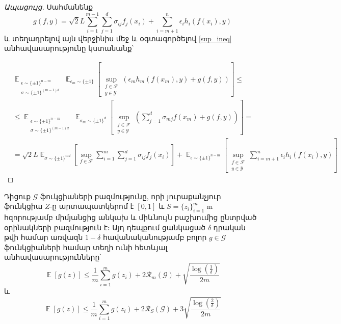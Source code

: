 \documentclass[11pt]{article}
\DeclareMathOperator*{\E}{\mathbb{E}}
\begin{document}
\begin{proof}[Ապացույց]
Սահմանենք $$g(f, y) = \sqrt{2}L\sum_{i=1}^{m-1}\sum_{j=1}^d{\sigma_{ij}f_j(x_i)}  + \sum_{i = m+1}^n\epsilon_ih_i(f(x_i), y)$$
և տեղադրելով այն վերջինիս մեջ և օգտագործելով \ref{sup_ineq} անհավասարությունը կստանանք՝


\begin{align*}
 &\E_{\substack{\epsilon \sim \{ \pm 1\}^{n-m}   \\ \sigma \sim \{ \pm 1\}^{(m-1)d} }}     \E_{\epsilon_m \sim \{ \pm1 \}} \left [          \sup_{\substack{f \in \mathcal{F} \\ y \in \mathcal{Y}}}     \left(\epsilon_m h_m(f(x_m), y)   +   g(f, y)			\right )	\right ] \leq \\
 &\leq  \E_{\substack{\epsilon \sim \{ \pm 1\}^{n-m}   \\ \sigma \sim \{ \pm 1\}^{(m-1)d} }}     \E_{\sigma_m \sim \{ \pm1 \}^d} \left [          \sup_{\substack{f \in \mathcal{F} \\ y \in \mathcal{Y}}}     \left( \sum_{j = 1}^d  \sigma_{mj}f(x_m) +   g(f, y)			\right )	\right ] =\\
 &= \sqrt{2}L \E_{\sigma \sim \{\pm1\}^{md}} \left[  \sup_{f \in \mathcal{F}}  \sum_{i=1}^m\sum_{j=1}^d{\sigma_{ij}f_j(x_i)}   \right] + \E_{\epsilon \sim \{\pm 1\}^{n-m}}\left[\sup_{\substack{f \in \mathcal{F} \\ y \in \mathcal{Y}} }  \sum_{i=m+1}^n{\epsilon_ih_i(f(x_i), y)}  \right] 
\end{align*}


\end{proof}
  
\begin{theorem}
\label{rad_comp_th}
Դիցուք $\mathcal{G}$ ֆուկցիաների բազմությունը, որի յուրաքանչյուր ֆունկցիա  $Z$-ը արտապատկերոմ է $[0, 1]$ և $S = \{z_i\}_{i=1}^m$ m հզորությամբ միմյանցից անկախ և միևնույն բաշխումից ընտրված օրինակների բազմություն է։ Այդ դեպքում ցանկացած $\delta$ դրական թվի համար առվազն $1 - \delta$ հավանականությամբ բոլոր $g \in \mathcal{G}$ ֆունկցիաների համար տեղի ունի հետևյալ անհավասարությունները՝
\begin{equation}
\E[g(z)] \leq \frac{1}{m}\sum_{i=1}^mg(z_i) + 2\mathcal{R}_m(\mathcal{G}) + \sqrt{\frac{\log\left( \frac{1}{\delta} \right)}{2m}}
\end{equation}
և
\begin{equation}
\E[g(z)] \leq \frac{1}{m}\sum_{i=1}^mg(z_i) + 2\mathcal{R}_S(\mathcal{G}) + 3\sqrt{\frac{\log \left( \frac{2}{\delta} \right)}{2m}}
\end{equation}
\end{theorem}
\end{document}
